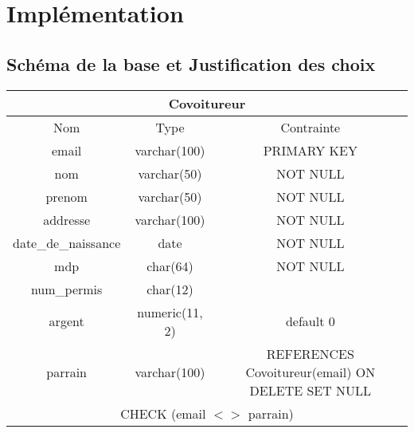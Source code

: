 	\section{Implémentation}	
	\subsection{Schéma de la base et Justification des choix}
	\begin{center}
		\begin{tabular}{|c|c|c|}
			\hline
			\multicolumn{3}{|c|}{Covoitureur}\\
			\hline
			Nom & Type & Contrainte \\
			\hline
			email & varchar(100) & PRIMARY KEY \\\hline
			nom & varchar(50) & NOT NULL \\\hline
			prenom & varchar(50) & NOT NULL \\\hline
			addresse & varchar(100) & NOT NULL \\\hline
			date\_de\_naissance & date & NOT NULL \\\hline
			mdp & char(64) & NOT NULL \\\hline
			num\_permis & char(12) & \\\hline
			argent & numeric(11, 2) & default 0 \\\hline
			parrain & varchar(100)	& REFERENCES Covoitureur(email) ON DELETE SET NULL \\\hline
			\multicolumn{3}{|c|}{CHECK (email  $< >$ parrain)}\\\hline
		\end{tabular}
		

\end{center}
